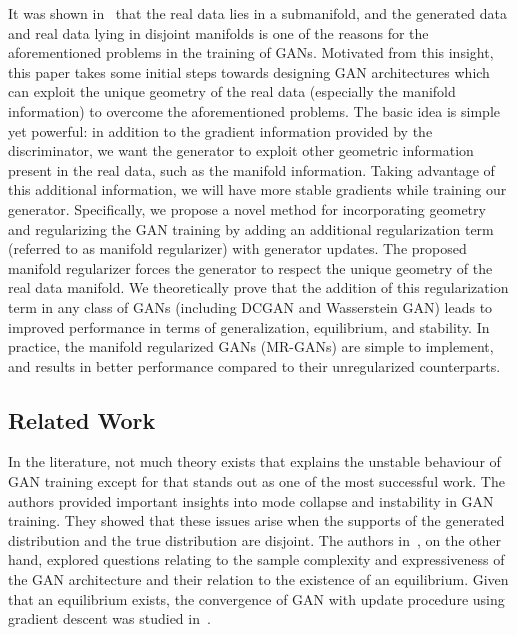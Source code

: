 \documentclass[10pt,twocolumn,letterpaper]{article}
\begin{document}
It was shown in~\cite{arjovsky2017towards} that the real data lies in a submanifold, and the generated data and real data lying in disjoint manifolds is one of the reasons for the aforementioned problems in the training of GANs. Motivated from this insight, this paper takes some initial steps towards designing GAN architectures which can exploit the unique geometry of the real data (especially the manifold information) to overcome the aforementioned problems. 
The basic idea
is simple yet powerful: in addition to the gradient
information provided by the discriminator, we want
the generator to exploit other geometric information present in the real data, such
as the manifold information. Taking advantage of this additional information, we will have more stable gradients while
training our generator. 
Specifically, we propose a novel method for incorporating geometry and regularizing the GAN training by adding an additional regularization term (referred to as manifold regularizer) with generator updates. The proposed manifold regularizer forces the generator to respect the unique geometry of the real data manifold. We theoretically prove that the addition of this regularization term in any class of GANs (including DCGAN and Wasserstein GAN) leads to improved performance in terms of generalization, equilibrium, and stability.
In practice, the manifold regularized GANs (MR-GANs) are simple to implement, and results in better performance compared to their unregularized counterparts.

\subsection{Related Work}
In the literature, not much theory exists that explains the unstable behaviour of GAN training except for \cite{arjovsky2017towards} that stands out as one of the most successful work. The authors provided important insights into mode collapse and instability in GAN training. They showed that these issues arise when the supports of the generated distribution and the true distribution are disjoint. The authors in~\cite{arora2017generalization}, on the other hand, explored questions relating to the sample complexity and expressiveness of the GAN architecture and their relation to the existence of an equilibrium. Given that an equilibrium exists, the convergence of GAN with update procedure using gradient descent was studied in~\cite{nagarajan2017gradient}.
\end{document}
